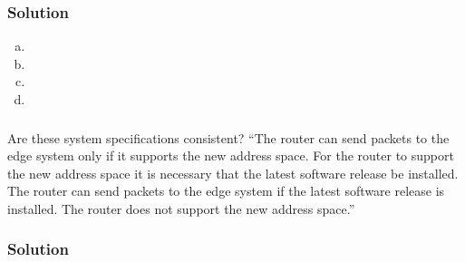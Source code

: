 \documentclass[11pt,a4paper]{article}
\newcommand{\problem}[1]{%
\setcounter{subsubsection}{#1}%
\addtocounter{subsubsection}{-1}%
\subsubsection{\hfill}%
}
\newcommand{\solution}{%
\subsubsection*{Solution}%
}
\begin{document}
		\solution{}
			\begin{enumerate}[a)]
				\item 
				\item 
				\item 
				\item 
			\end{enumerate}
		\problem{11}
			Are these system specifications consistent? ``The router can send packets to the edge system only if it supports the new address space. For the router to support the new address space it is necessary that the latest software release be installed. The router can send packets to the edge system if the latest software release is installed. The router does not support the new address space.''
		\solution{}
\end{document}
